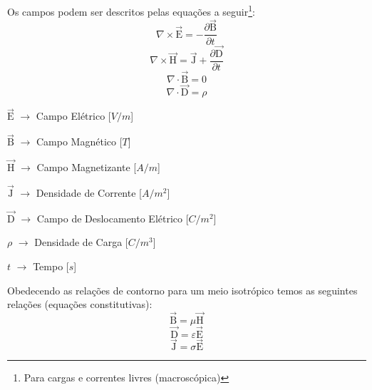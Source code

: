         Os campos podem ser descritos pelas equações a seguir\footnote{Para cargas e correntes livres
        (macroscópica)}:
            \begin{equation}
                \label{rot_elet_max}
                \nabla \times \vec{\textrm{E}}=-\frac{\partial \vec{\textrm{B}}}{\partial t} 
            \end{equation}
            \begin{equation}
                \label{rot_mag_max}
                \nabla \times \vec{\textrm{H}} = \vec{\textrm{J}} + \frac{\partial \vec{\textrm{D}}}{\partial t}
            \end{equation}
            \begin{equation}
                \nabla \cdot \vec{\textrm{B}} = 0
            \end{equation}
            \begin{equation}
                \nabla \cdot \vec{\textrm{D}} = \rho
            \end{equation}

            $\vec{\textrm{E}}$ $\rightarrow$ Campo Elétrico [$V/m$]
	    
            $\vec{\textrm{B}}$ $\rightarrow$ Campo Magnético [$T$]
	    
            $\vec{\textrm{H}}$ $\rightarrow$ Campo Magnetizante [$A/m$]
	    
            $\vec{\textrm{J}}$ $\rightarrow$ Densidade de Corrente [$A/m^2$]
	    
            $\vec{\textrm{D}}$ $\rightarrow$ Campo de Deslocamento Elétrico [$C/m^2$]
	    
            $\rho$ $\rightarrow$ Densidade de Carga [$C/m^3$]
	    
            $t$ $\rightarrow$ Tempo [$s$]

            Obedecendo as relações de contorno para um meio isotrópico temos as seguintes
            relações (equações constitutivas):
            \begin{equation}
                \label{con_B}
                \vec{\textrm{B}} = \mu \vec{\textrm{H}}
            \end{equation}
            \begin{equation}
                \label{con_D}
                \vec{\textrm{D}} = \varepsilon  \vec{\textrm{E}}
            \end{equation}
            \begin{equation}
                \label{con_J}
                \vec{\textrm{J}} = \sigma \vec{\textrm{E}}
            \end{equation}
	    
